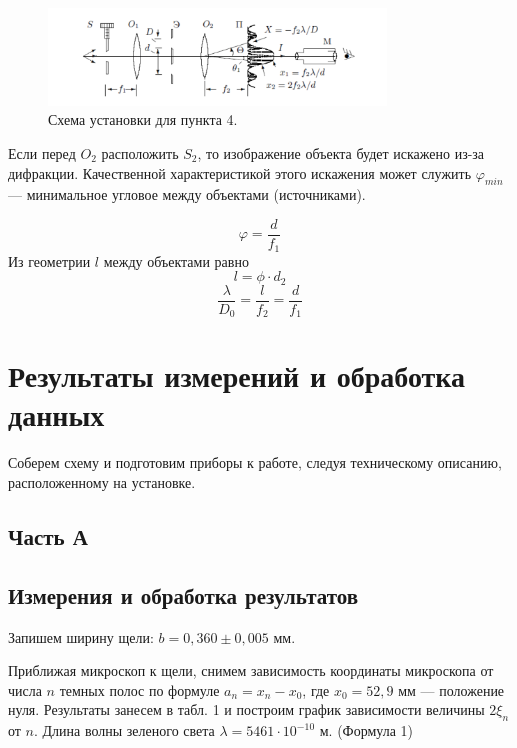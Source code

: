 \begin{figure}[h]
\begin{center}
\includegraphics[width = 0.8\textwidth]{5.png}
\caption{Схема установки для пункта 4.}
\end{center}
\end{figure}

Если перед $O_2$ расположить $S_2$, то изображение объекта будет искажено из-за дифракции. Качественной характеристикой этого искажения может служить $\varphi_{min}$ --- минимальное угловое между объектами (источниками). 

\begin{equation}
\varphi = \frac{d}{f_1}
\end{equation}
Из геометрии $l$ между объектами равно 
\begin{equation}
l = \phi \cdot d_2
\end{equation}
\begin{equation}
\dfrac{\lambda}{D_0} = \dfrac{l}{f_2} = \dfrac{d}{f_1}
\end{equation}

\newpage
\section{Результаты измерений и обработка данных}

Соберем схему и подготовим приборы к работе, следуя техническому описанию, расположенному на установке.


\subsection*{Часть А}

\subsection{Измерения и обработка результатов}

Запишем ширину щели: $ b = 0,360 \pm 0,005 $ мм. 

Приближая микроскоп к щели, снимем зависимость координаты микроскопа от числа $ n $ темных полос по формуле $ a_n = x_n - x_0 $, где $ x_0 = 52,9 $ мм --- положение нуля. Результаты занесем в табл. 1 и построим график зависимости величины $ 2\xi_n $ от $ n $. Длина волны зеленого света $ \lambda = 5461 \cdot 10^{-10} $ м. (Формула 1)

